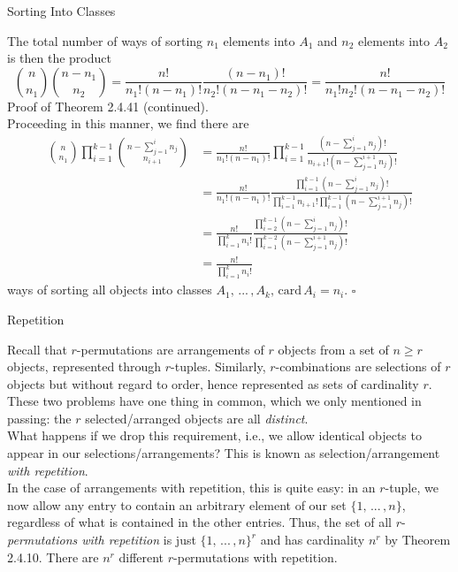 \documentclass[smaller,hyperref={CJKbookmarks=true}]{beamer}
\begin{document}
\begin{frame}{Sorting Into Classes}
\begin{spacing}{1}
The total number of ways of sorting $n_1$ elements into $A_1$ and $n_2$ elements into $A_2$ is then the product
\[\binom{n}{n_1}\binom{n-n_1}{n_2}=\frac{n!}{n_1!(n-n_1)!}\frac{(n-n_1)!}{n_2!(n-n_1-n_2)!}
=\frac{n!}{n_1!n_2!(n-n_1-n_2)!}\]
\newpage
\alert{Proof of Theorem 2.4.41 (continued).}\\
Proceeding in this manner, we find there are
\begin{equation*}
  \begin{split}
     \binom{n}{n_1}\prod\limits_{i=1}^{k-1}\binom{n-\sum\nolimits_{j=1}^{i}n_j}{n_{i+1}} &=\frac{n!}{n_1!(n-n_1)!}\prod\limits_{i=1}^{k-1}\frac{(n-\sum\nolimits_{j=1}^{i}n_j)!}{n_{i+1}!(n-\sum\nolimits_{j=1}^{i+1}n_j)!} \\
       &=\frac{n!}{n_1!(n-n_1)!}\frac{\prod\nolimits_{i=1}^{k-1}(n-\sum\nolimits_{j=1}^{i}n_j)!}{\prod\nolimits_{i=1}^{k-1}n_{i+1}!\prod\nolimits_{i=1}^{k-1}(n-\sum_{j=1}^{i+1}n_j)!} \\
       &=\frac{n!}{\prod\nolimits_{i=1}^{k}n_i!}\frac{\prod\nolimits_{i=2}^{k-1}(n-\sum\nolimits_{j=1}^{i}n_j)!}{\prod\nolimits_{i=1}^{k-2}(n-\sum\nolimits_{j=1}^{i+1}n_j)!} \\
       &=\frac{n!}{\prod\nolimits_{i=1}^{k}n_i!}
  \end{split}
\end{equation*}
ways of sorting all objects into classes $A_1,\,...\,,A_k,\,\text{card}\,A_i=n_i$.
\hfill$\square$
\end{spacing}
\end{frame}
\begin{frame}[t]{Repetition}
\begin{spacing}{1.1}
Recall that $r$-permutations are arrangements of $r$ objects from a set of $n\geq r$ objects, represented through $r$-tuples. Similarly, $r$-combinations are selections of $r$ objects but without regard to order, hence represented as sets of cardinality $r$. These two problems have one thing in common, which we only mentioned in passing: the $r$ selected/arranged objects are all \emph{distinct}.\\[5pt]
What happens if we drop this requirement, i.e., we allow identical objects
to appear in our selections/arrangements? This is known as
selection/arrangement \emph{with repetition}.\\[6pt]
In the case of arrangements with repetition, this is quite easy: in an
$r$-tuple, we now allow any entry to contain an arbitrary element of our set $\{1,\,...\,,n\}$, regardless of what is contained in the other entries. Thus, the set of all $r$-\emph{permutations with repetition} is just $\{1,\,...\,,n\}^r$ and has cardinality $n^r$ by Theorem 2.4.10. There are $n^r$ different $r$-permutations with repetition.
\end{spacing}
\end{frame}
\end{document}
